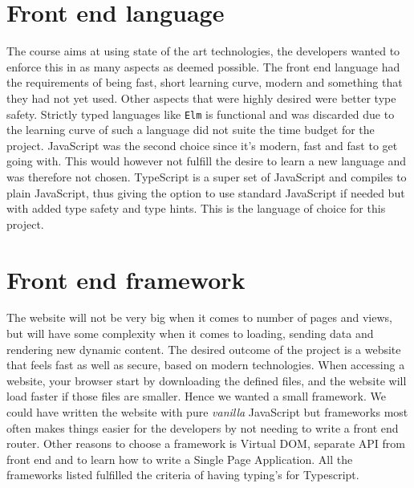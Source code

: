 \documentclass[12pt,a4paper]{report}
\begin{document}
\section{Front end language}
The course aims at using state of the art technologies, the developers wanted to enforce this in as many aspects as deemed possible. The front end language had the requirements of being fast, short learning curve, modern and something that they had not yet used.
Other aspects that were highly desired were better type safety.
Strictly typed languages like \texttt{Elm} is functional and was discarded due to the learning curve of such a language did not suite the time budget for the project.
JavaScript was the second choice since it's modern, fast and fast to get going with. This would however not fulfill the desire to learn a new language and was therefore not chosen.
TypeScript is a super set of JavaScript and compiles to plain JavaScript, thus giving the option to use standard JavaScript if needed but with added type safety and type hints. This is the language of choice for this project.

\section{Front end framework}
The website will not be very big when it comes to number of pages and views, but will have some complexity when it comes to loading, sending data and rendering new dynamic content.
The desired outcome of the project is a website that feels fast as well as secure, based on modern technologies. When accessing a website, your browser start by downloading the defined files, and the website will load faster if those files are smaller. Hence we wanted a small framework.
We could have written the website with pure \textit{vanilla} JavaScript but frameworks most often makes things easier for the developers by not needing to write a front end router. Other reasons to choose a framework is Virtual DOM, separate API from front end and to learn how to write a Single Page Application.
All the frameworks listed fulfilled the criteria of having typing's for Typescript.
\end{document}
